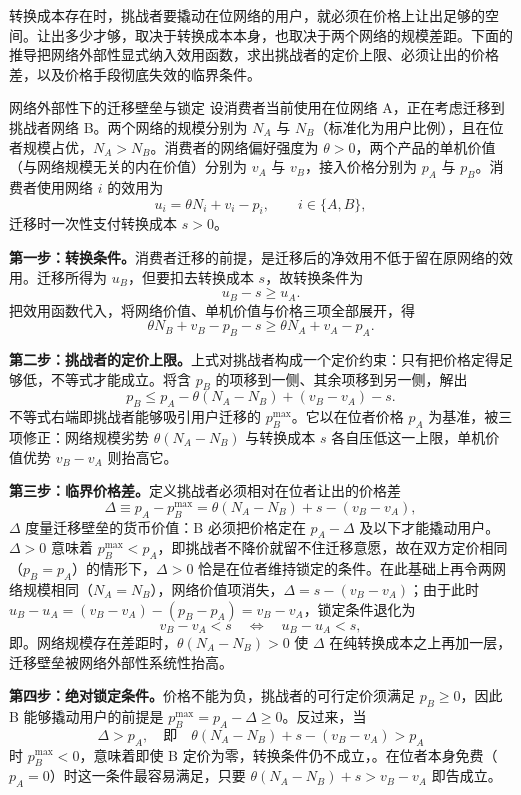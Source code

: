 转换成本存在时，挑战者要撬动在位网络的用户，就必须在价格上让出足够的空间。让出多少才够，取决于转换成本本身，也取决于两个网络的规模差距。下面的推导把网络外部性显式纳入效用函数，求出挑战者的定价上限、必须让出的价格差，以及价格手段彻底失效的临界条件。

\begin{derivation}{网络外部性下的迁移壁垒与锁定}{}
设消费者当前使用在位网络 A，正在考虑迁移到挑战者网络 B。两个网络的规模分别为 $N_A$ 与 $N_B$（标准化为用户比例），且在位者规模占优，$N_A > N_B$。消费者的网络偏好强度为 $\theta > 0$，两个产品的单机价值（与网络规模无关的内在价值）分别为 $v_A$ 与 $v_B$，接入价格分别为 $p_A$ 与 $p_B$。消费者使用网络 $i$ 的效用为
\[
u_i = \theta N_i + v_i - p_i, \qquad i \in \{A, B\},
\]
迁移时一次性支付转换成本 $s > 0$。

\textbf{第一步：转换条件。}消费者迁移的前提，是迁移后的净效用不低于留在原网络的效用。迁移所得为 $u_B$，但要扣去转换成本 $s$，故转换条件为
\[
u_B - s \geq u_A.
\]
把效用函数代入，将网络价值、单机价值与价格三项全部展开，得
\[
\theta N_B + v_B - p_B - s \geq \theta N_A + v_A - p_A.
\]

\textbf{第二步：挑战者的定价上限。}上式对挑战者构成一个定价约束：只有把价格定得足够低，不等式才能成立。将含 $p_B$ 的项移到一侧、其余项移到另一侧，解出
\[
p_B \leq p_A - \theta(N_A - N_B) + (v_B - v_A) - s.
\]
不等式右端即挑战者能够吸引用户迁移的 $p_B^{\max}$。它以在位者价格 $p_A$ 为基准，被三项修正：网络规模劣势 $\theta(N_A - N_B)$ 与转换成本 $s$ 各自压低这一上限，单机价值优势 $v_B - v_A$ 则抬高它。

\textbf{第三步：临界价格差。}定义挑战者必须相对在位者让出的价格差
\[
\Delta \equiv p_A - p_B^{\max} = \theta(N_A - N_B) + s - (v_B - v_A),
\]
$\Delta$ 度量迁移壁垒的货币价值：B 必须把价格定在 $p_A - \Delta$ 及以下才能撬动用户。$\Delta > 0$ 意味着 $p_B^{\max} < p_A$，即挑战者不降价就留不住迁移意愿，故在双方定价相同（$p_B = p_A$）的情形下，$\Delta > 0$ 恰是在位者维持锁定的条件。在此基础上再令两网络规模相同（$N_A = N_B$），网络价值项消失，$\Delta = s - (v_B - v_A)$；由于此时 $u_B - u_A = (v_B - v_A) - (p_B - p_A) = v_B - v_A$，锁定条件退化为
\[
v_B - v_A < s \quad\Longleftrightarrow\quad u_B - u_A < s,
\]
即。网络规模存在差距时，$\theta(N_A - N_B) > 0$ 使 $\Delta$ 在纯转换成本之上再加一层，迁移壁垒被网络外部性系统性抬高。

\textbf{第四步：绝对锁定条件。}价格不能为负，挑战者的可行定价须满足 $p_B \geq 0$，因此 B 能够撬动用户的前提是 $p_B^{\max} = p_A - \Delta \geq 0$。反过来，当
\[
\Delta > p_A, \quad \text{即} \quad \theta(N_A - N_B) + s - (v_B - v_A) > p_A
\]
时 $p_B^{\max} < 0$，意味着即使 B 定价为零，转换条件仍不成立，。在位者本身免费（$p_A = 0$）时这一条件最容易满足，只要 $\theta(N_A - N_B) + s > v_B - v_A$ 即告成立。


\end{derivation}
